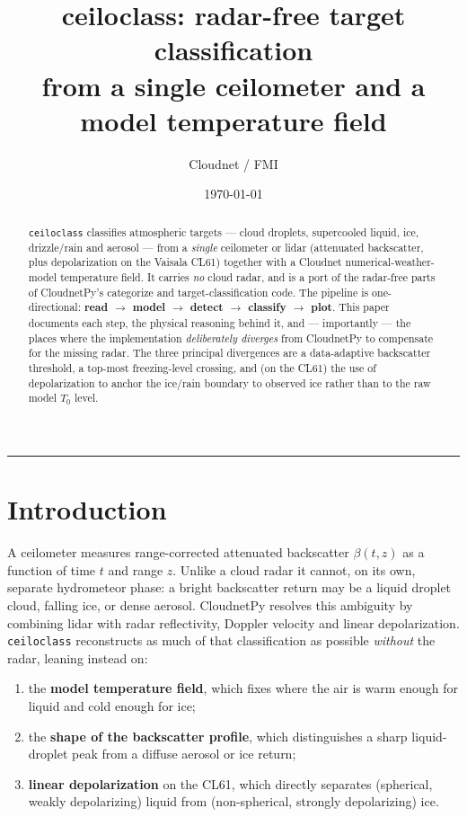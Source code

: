 \documentclass[11pt,a4paper]{article}
\title{\textbf{ceiloclass}: radar-free target classification\\
from a single ceilometer and a model temperature field}
\author{Cloudnet / FMI}
\date{\today}
\newcommand{\Tzero}{\ensuremath{T_0}}
\newcommand{\code}[1]{\texttt{#1}}
\begin{document}
\maketitle

\begin{abstract}
\noindent
\code{ceiloclass} classifies atmospheric targets --- cloud droplets, supercooled
liquid, ice, drizzle/rain and aerosol --- from a \emph{single} ceilometer or
lidar (attenuated backscatter, plus depolarization on the Vaisala CL61) together
with a Cloudnet numerical-weather-model temperature field. It carries \emph{no}
cloud radar, and is a port of the radar-free parts of CloudnetPy's categorize and
target-classification code. The pipeline is one-directional:
\textbf{read $\rightarrow$ model $\rightarrow$ detect $\rightarrow$ classify
$\rightarrow$ plot}. This paper documents each step, the physical reasoning
behind it, and --- importantly --- the places where the implementation
\emph{deliberately diverges} from CloudnetPy to compensate for the missing radar.
The three principal divergences are a data-adaptive backscatter threshold, a
top-most freezing-level crossing, and (on the CL61) the use of depolarization to
anchor the ice/rain boundary to observed ice rather than to the raw model
\Tzero{} level.
\end{abstract}

\tableofcontents
\medskip
\hrule

\section{Introduction}

A ceilometer measures range-corrected attenuated backscatter $\beta(t, z)$ as a
function of time $t$ and range $z$. Unlike a cloud radar it cannot, on its own,
separate hydrometeor phase: a bright backscatter return may be a liquid droplet
cloud, falling ice, or dense aerosol. CloudnetPy resolves this ambiguity by
combining lidar with radar reflectivity, Doppler velocity and
linear depolarization. \code{ceiloclass} reconstructs as much of that
classification as possible \emph{without} the radar, leaning instead on:

\begin{enumerate}[nosep]
  \item the \textbf{model temperature field}, which fixes where the air is warm
        enough for liquid and cold enough for ice;
  \item the \textbf{shape of the backscatter profile}, which distinguishes a
        sharp liquid-droplet peak from a diffuse aerosol or ice return;
  \item \textbf{linear depolarization} on the CL61, which directly separates
        (spherical, weakly depolarizing) liquid from (non-spherical, strongly
        depolarizing) ice.
\end{enumerate}
\end{document}
